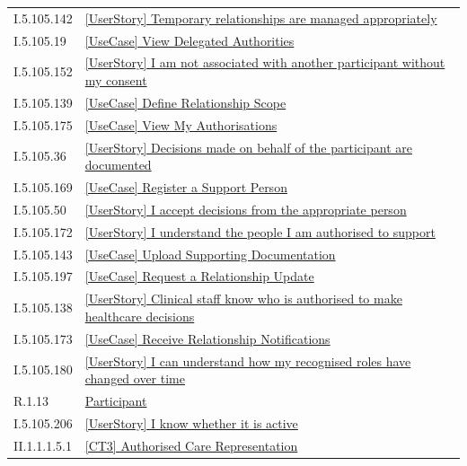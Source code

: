 \begin{longtable}{p{.22\linewidth}p{.73\linewidth}}
I.5.105.142 & \hyperref[element:80e42a46bfd6465fa513dfed427d2bdb]{[UserStory] Temporary relationships are managed appropriately} \\
I.5.105.19 & \hyperref[element:8363abf87fc046b6a451be3fa8b85297]{[UseCase] View Delegated Authorities} \\
I.5.105.152 & \hyperref[element:854d54ea1cd44a1781597ab8543b2d40]{[UserStory] I am not associated with another participant without my consent} \\
I.5.105.139 & \hyperref[element:8d6659e81276473d855c28e001e6ecfb]{[UseCase] Define Relationship Scope} \\
I.5.105.175 & \hyperref[element:8efbfab6d49f48ee8c48830664c7c61f]{[UseCase] View My Authorisations} \\
I.5.105.36 & \hyperref[element:8f33280ba961466cafe16b8525cef65e]{[UserStory] Decisions made on behalf of the participant are documented} \\
I.5.105.169 & \hyperref[element:92527756176a48628ac2a09734e59726]{[UseCase] Register a Support Person} \\
I.5.105.50 & \hyperref[element:9286a0cc02804ab0a359f639b3a6a078]{[UserStory] I accept decisions from the appropriate person} \\
I.5.105.172 & \hyperref[element:93c87b208a194faaaf51c4eec510e0de]{[UserStory] I understand the people I am authorised to support} \\
I.5.105.143 & \hyperref[element:95fbe0aa44464b7e906171adfd37d3d7]{[UseCase] Upload Supporting Documentation} \\
I.5.105.197 & \hyperref[element:97a9237c0549471bb0e78ba2e9b9bd27]{[UseCase] Request a Relationship Update} \\
I.5.105.138 & \hyperref[element:9c885d66d07945d09b4267d0d55710cf]{[UserStory] Clinical staff know who is authorised to make healthcare decisions} \\
I.5.105.173 & \hyperref[element:9f43c12db6ef4569aa72372891389642]{[UseCase] Receive Relationship Notifications} \\
I.5.105.180 & \hyperref[element:a206093c3b4147d18eeb053445b9cd61]{[UserStory] I can understand how my recognised roles have changed over time} \\
R.1.13 & \hyperref[element:a3d1f5cc3e9b4d9eab326a5388445101]{Participant} \\
I.5.105.206 & \hyperref[element:a4f1e64c0e614dbbb4a84a466e5431f8]{[UserStory] I know whether it is active} \\
II.1.1.1.5.1 & \hyperref[element:a7092757af934517850ff63707397050]{[CT3] Authorised Care Representation} \\

\end{longtable}
